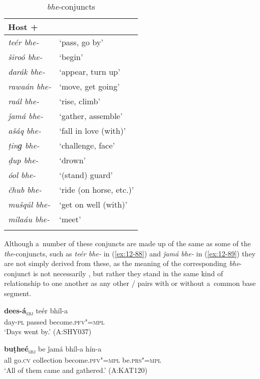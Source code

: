 \begin{table}[ht]
\caption{\textit{bhe}-conjuncts}
\begin{tabularx}{.75\textwidth}{ l@{\hspace{45pt}} Q }
\lsptoprule
Host +  &
\\\midrule
\textit{teér bhe-} &
`pass, go by'\\
\textit{široó bhe-} &
`begin'\\
\textit{darák bhe-} &
`appear, turn up'\\
\textit{rawaán bhe-} &
`move, get going'\\
\textit{raál bhe-} &
`rise, climb'\\
\textit{ǰamá bhe-} &
`gather, assemble'\\
\textit{ašáq bhe-} &
`fall in love (with)'\\
\textit{ṭinɡ bhe-} &
`challenge, face'\\
\textit{ḍup bhe-} &
`drown'\\
\textit{óol bhe-} &
`(stand) guard'\\
\textit{čhub bhe-} &
`ride (on horse, etc.)'\\
\textit{mušqúl bhe-} &
`get on well (with)'\\
\textit{milaáu bhe-} &
`meet'\\\lspbottomrule
\end{tabularx}
\label{tab:12-6}
\end{table}


Although a~number of these conjuncts are made up of the same  as some of the \textit{the}-conjuncts, such as \textit{teér bhe-} in (\ref{ex:12-88}) and \textit{ǰamá bhe-} in (\ref{ex:12-89}) they are not simply derived from these, as the meaning of the corresponding \textit{bhe}-conjunct is not necessarily , but rather they stand in the same kind of relationship to one another as any other / pairs with or without a~common base segment.

\begin{exe}
\ex
\label{ex:12-88}
\gll {\ob}\textbf{dees-á}{\cb}\textsubscript{\textsc{\upshape sbj}} teér bhíl-a\\
day-\textsc{pl} passed become.\textsc{pfv"=mpl}\\
\glt `Days went by.' (A:SHY037)
\end{exe}
\begin{exe}
\ex
\label{ex:12-89}
\gll {\ob}\textbf{buṭheé}{\cb}\textsubscript{\textsc{\upshape sbj}} be ǰamá bhíl-a hín-a\\
all go.\textsc{cv} collection become.\textsc{pfv"=mpl} be.\textsc{prs"=mpl} \\
\glt `All of them came and gathered.' (A:KAT120)
\end{exe}

